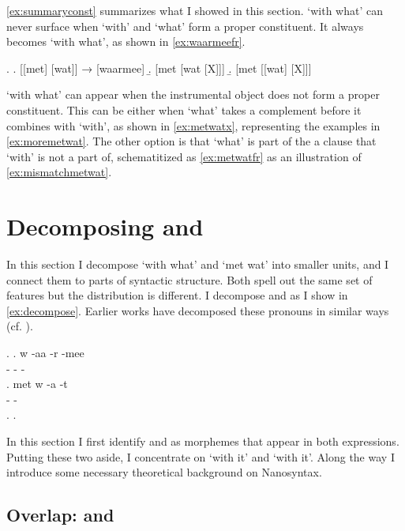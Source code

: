 \documentclass[12pt]{article}
\begin{document}
\ref{ex:summaryconst} summarizes what I showed in this section.  `with what' can never surface when  `with' and  `what' form a proper constituent. It always becomes  `with what', as shown in \ref{ex:waarmeefr}.

\ex.\label{ex:summaryconst}
\a. [[met] [wat]] → [waarmee]\label{ex:waarmeefr}
\b. [met [wat [X]]]\label{ex:metwatx}
\b. [met [[wat] [X]]]\label{ex:metwatfr}

 `with what' can appear when the instrumental object does not form a proper constituent. This can be either when  `what' takes a complement before it combines with  `with', as shown in \ref{ex:metwatx}, representing the examples in \ref{ex:moremetwat}.  The other option is that  `what' is part of the a clause that  `with' is not a part of, schematitized as \ref{ex:metwatfr} as an illustration of \ref{ex:mismatchmetwat}.


\section{Decomposing  and }\label{sec:takingapart}

In this section I decompose  `with what' and  `met wat' into smaller units, and I connect them to parts of syntactic structure. Both spell out the same set of features but the distribution is different. I decompose  and  as I show in \ref{ex:decompose}. Earlier works have decomposed these pronouns in similar ways (cf. \citet{hachem2015,noonan2017dutch,wesseling2018}).

\ex.\label{ex:decompose}
\ag. w -aa -r -mee\\
 - - -\\
\bg. met w -a -t\\
  - -\\
\z.
\z.

In this section I first identify  and  as morphemes that appear in both expressions. Putting these two aside, I concentrate on  `with it' and  `with it'. Along the way I introduce some necessary theoretical background on Nanosyntax.

\subsection{Overlap:  and }
\end{document}
